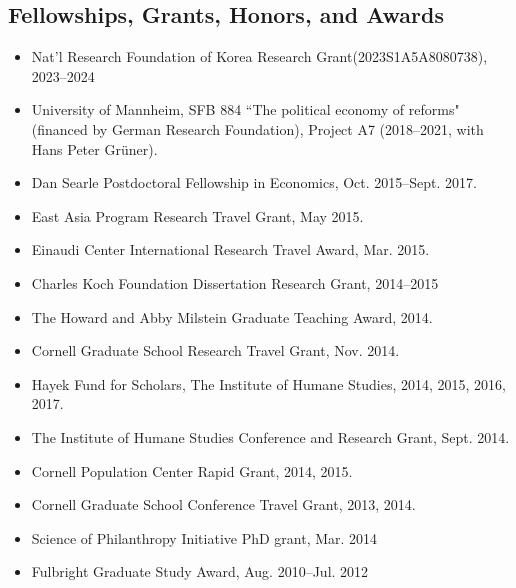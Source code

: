 \documentclass[margin, a4paper]{res}
\begin{document}
\begin{resume}
\section{Fellowships, Grants, Honors, and Awards}
\begin{itemize}[leftmargin=*]
\item Nat'l Research Foundation of Korea Research Grant(2023S1A5A8080738), 2023--2024
\item University of Mannheim, SFB 884 ``The political economy of reforms" (financed by German Research Foundation), Project A7 (2018--2021, with Hans Peter Gr{\"u}ner).
\item Dan Searle Postdoctoral Fellowship in Economics, Oct. 2015--Sept. 2017.
\item East Asia Program Research Travel Grant, May 2015.
\item Einaudi Center International Research Travel Award, Mar. 2015.
\item Charles Koch Foundation Dissertation Research Grant, 2014--2015
\item The Howard and Abby Milstein Graduate Teaching Award, 2014.
\item Cornell Graduate School Research Travel Grant, Nov. 2014.
\item Hayek Fund for Scholars, The Institute of Humane Studies, 2014, 2015, 2016, 2017.
\item The Institute of Humane Studies Conference and Research Grant, Sept. 2014.
\item Cornell Population Center Rapid Grant, 2014, 2015.
\item Cornell Graduate School Conference Travel Grant, 2013, 2014.
\item Science of Philanthropy Initiative PhD grant, Mar. 2014
\item Fulbright Graduate Study Award, Aug. 2010--Jul. 2012
\end{itemize}


\end{resume}
\end{document}
